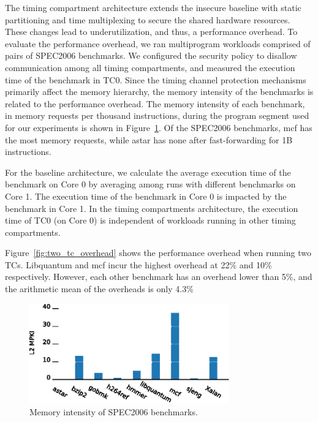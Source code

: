 The timing compartment architecture extends the insecure baseline with
static partitioning and time multiplexing to secure the shared hardware 
resources. These changes lead to underutilization, and thus, a performance
overhead. To evaluate the performance overhead, we ran multiprogram workloads 
comprised of pairs of SPEC2006 benchmarks.
We configured the security policy to disallow communication among all timing 
compartments, and measured the execution time of the benchmark
in TC0. Since the timing channel protection mechanisms primarily affect the 
memory hierarchy, the memory intensity of the benchmarks is related to the 
performance overhead.
The memory intensity of each benchmark, in memory requests per thousand 
instructions, during the program segment used for our experiments is shown in
Figure~\ref{fig:memstudy}. Of the SPEC2006 benchmarks, mcf has the most memory 
requests, while astar has none after fast-forwarding for 1B instructions.

For the baseline architecture, we calculate the average execution time of the 
benchmark on Core 0 by averaging among runs with different benchmarks on Core 
1.  The execution time of the benchmark in Core 0 is impacted by the benchmark 
in Core 1. In the timing compartments architecture, the execution time of TC0 
(on Core 0) is independent of workloads running in other timing compartments.

Figure~\ref{fig:two_tc_overhead} shows the performance overhead when running 
two TCs. Libquantum and mcf incur the highest overhead at 22\% and 10\% 
respectively. However, each other benchmark has an overhead lower than 5\%, and 
the arithmetic mean of the overheads is only 4.3\%

\begin{figure}
    \begin{center}
        \includegraphics[width=3.4in]{figs/MPKI.eps}
        \caption{Memory intensity of SPEC2006 benchmarks.}
        \label{fig:memstudy}
    \end{center}
\end{figure}

